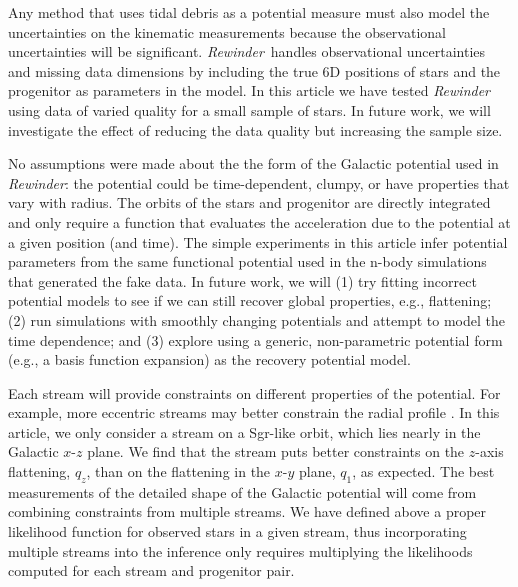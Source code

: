 \documentclass[letterpaper,12pt,preprint]{aastex}
\newcommand{\rewinder}{\emph{Rewinder}}
\begin{document}
Any method that uses tidal debris as a potential measure must also model the uncertainties on the kinematic measurements because the observational uncertainties will be significant. \rewinder\, handles observational uncertainties and missing data dimensions by including the true 6D positions of stars and the progenitor as parameters in the model. In this article we have tested \rewinder\, using data of varied quality for a small sample of stars. In future work, we will investigate the effect of reducing the data quality but increasing the sample size.

No assumptions were made about the the form of the Galactic potential used in \rewinder: the potential could be time-dependent, clumpy, or have properties that vary with radius. The orbits of the stars and progenitor are directly integrated and only require a function that evaluates the acceleration due to the potential at a given position (and time). The simple experiments in this article infer potential parameters from the same functional potential used in the n-body simulations that generated the fake data. In future work, we will (1) try fitting incorrect potential models to see if we can still recover global properties, e.g., flattening; (2) run simulations with smoothly changing potentials \citep[e.g.,][]{buist14} and attempt to model the time dependence; and (3) explore using a generic, non-parametric potential form (e.g., a basis function expansion) as the recovery potential model. 

Each stream will provide constraints on different properties of the potential. For example, more eccentric streams may better constrain the radial profile \citep[see][who illustrate the power of using multiple streams to simultaneously constrain the potential using orbit fitting]{deg14}. In this article, we only consider a stream on a Sgr-like orbit, which lies nearly in the Galactic $x$-$z$ plane. We find that the stream puts better constraints on the $z$-axis flattening, $q_z$, than on the flattening in the $x$-$y$ plane, $q_1$, as expected. The best measurements of the detailed shape of the Galactic potential will come from combining constraints from multiple streams. We have defined above a proper likelihood function for observed stars in a given stream, thus incorporating multiple streams into the inference only requires multiplying the likelihoods computed for each stream and progenitor pair.
\end{document}
